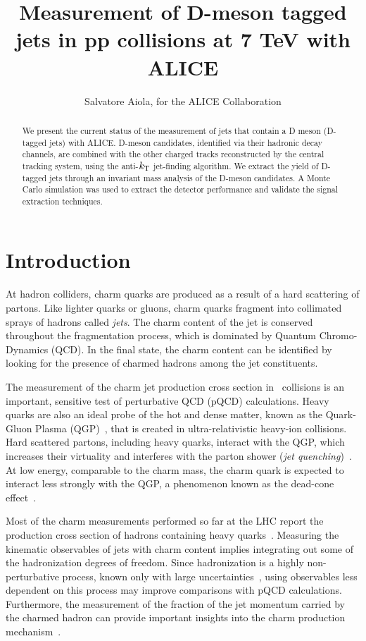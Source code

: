 \documentclass[a4paper]{jpconf}
\begin{document}
\title{Measurement of D-meson tagged jets in pp collisions at 7 TeV with ALICE}

\author{Salvatore Aiola, for the ALICE Collaboration}

\address{Physics Department, Yale University, 266 Whitney Avenue, New Haven, CT 06511}


\begin{abstract}
We present the current status of the measurement of jets that contain a D meson (D-tagged jets) with \mbox{ALICE}.
D-meson candidates, identified via their hadronic decay channels, are combined with the other charged tracks reconstructed by the central tracking system, 
using the anti-$k_{\rm T}$ jet-finding algorithm.
We extract the yield of D-tagged jets through an invariant mass analysis of the D-meson candidates.
A Monte Carlo simulation was used to extract the detector performance and validate the signal extraction techniques.
\end{abstract}

\section{Introduction}
At hadron colliders, charm quarks are produced as a result of a hard scattering of partons. Like lighter quarks or gluons, charm quarks
fragment into collimated sprays of hadrons called \emph{jets}. The charm content of the jet is conserved throughout the fragmentation process,
which is dominated by Quantum Chromo-Dynamics (QCD).
In the final state, the charm content can be identified by looking for the presence of charmed hadrons among the jet constituents.

The measurement of the charm jet production cross section in \pp\ collisions is an important, sensitive test of perturbative QCD (pQCD) calculations.
Heavy quarks are also an ideal probe of the hot and dense matter, 
known as the Quark-Gluon Plasma (QGP)~\cite{STAR:2005a, PHENIX:2005a}, 
that is created in ultra-relativistic heavy-ion collisions. 
Hard scattered partons, including heavy quarks, interact with the QGP, which increases their virtuality and interferes with the
parton shower (\emph{jet quenching})~\cite{PHENIX:2008b, CMS:2012b, ALICE:2015a}.
At low energy, comparable to the charm mass, the charm quark is expected
to interact less strongly with the QGP, a phenomenon known as the dead-cone effect~\cite{Dokshitzer:2001}.

Most of the charm measurements performed so far at the LHC report the production cross section of hadrons
containing heavy quarks~\cite{ALICE:2012d, LHCb:2013a, ATLAS:2016a, ALICE:2016b}.
Measuring the kinematic observables of jets with charm content implies integrating out some of the hadronization degrees of freedom. 
Since hadronization is a highly non-perturbative process, known only with large uncertainties~\cite{dEnterria:2014}, 
using observables less dependent on this process may improve comparisons with pQCD calculations.
Furthermore, the measurement of the fraction of the jet momentum carried 
by the charmed hadron can provide important insights into the charm production mechanism~\cite{CDF:1990, UA1:1990, STAR:2009a, ATLAS:2012d}.
\end{document}
